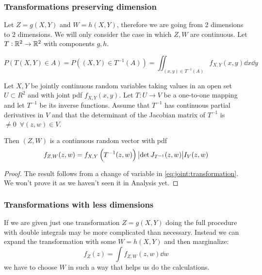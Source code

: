 \documentclass[14pt]{extarticle}
\begin{document}
\subsubsection{Transformations preserving dimension}

Let $Z = g(X, Y)$ and $W = h(X, Y)$, therefore we are going from 2 dimensions to 2 dimensions.
We will only consider the case in which $Z, W$ are continuous.
Let $T: \mathbb{R}^2 \to \mathbb{R}^2$ with components $g, h$.

\begin{equation}
    \label{eq:joint:transformation}
    P\left(T(X, Y) \in A\right) = P \left((X, Y) \in T^{-1}(A)\right) = \iint_{(x,y) \in T^{-1}(A)} f_{X, Y}(x, y) \dd{x} \dd{y}
\end{equation}

\begin{theorem}
    Let $X, Y$ be jointly continuous random variables taking values in an open set $U \subset R^2$ and with joint pdf $f_{X, Y}(x, y)$.
    Let $T:U \to V$ be a one-to-one mapping and let $T^{-1}$ be its inverse functions.
    Assume that $T^{-1}$ has continuous partial derivatives in $V$ and that the determinant of the Jacobian matrix of $T^{-1}$ is $\ne 0 \enspace \forall (z, w) \in V$.

    Then $(Z, W)$ is a continuous random vector with pdf
    \begin{equation}
        f_{Z, W}(z, w) = f_{X, Y}\left(T^{-1}(z, w)\right) \abs{\det J_{T^{-1}}(z, w)} I_V(z, w)
    \end{equation}
\end{theorem}

\begin{proof}
    The result follows from a change of variable in \autoref{eq:joint:transformation}.
    We won't prove it as we haven't seen it in Analysis yet.
\end{proof}

\subsubsection{Transformations with less dimensions}

If we are given just one transformation $Z = g(X, Y)$ doing the full procedure with double integrals may be more complicated than necessary.
Instead we can expand the transformation with some $W = h(X, Y)$ and then marginalize:
\begin{equation}
    f_Z(z) = \int f_{Z, W}(z, w) \dd{w}
\end{equation}
we have to choose $W$ in such a way that helps us do the calculations.
\end{document}
